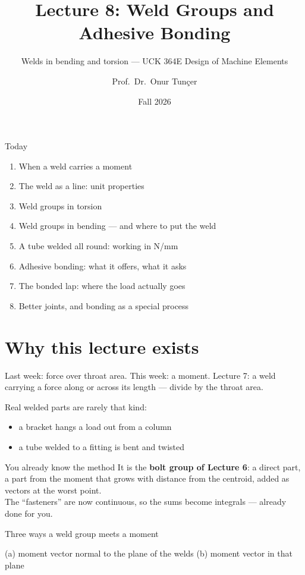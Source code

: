 \documentclass[aspectratio=169,10pt]{beamer}
\title{Lecture 8: Weld Groups and Adhesive Bonding}
\subtitle{Welds in bending and torsion --- UCK 364E Design of Machine Elements}
\author{Prof.\ Dr.\ Onur Tunçer}
\institute{Department of Aeronautical Engineering, Istanbul Technical University}
\date{Fall 2026}
\begin{document}
\maketitle

\begin{frame}{Today}
\begin{enumerate}
  \item When a weld carries a moment
  \item The weld as a line: unit properties
  \item Weld groups in torsion
  \item Weld groups in bending --- and where to put the weld
  \item A tube welded all round: working in N/mm
  \item Adhesive bonding: what it offers, what it asks
  \item The bonded lap: where the load actually goes
  \item Better joints, and bonding as a special process
\end{enumerate}
\end{frame}

\section{Why this lecture exists}

\begin{frame}{Last week: force over throat area. This week: a moment.}
Lecture 7: a weld carrying a force along or across its length --- divide by the throat area.

\medskip
Real welded parts are rarely that kind:
\begin{itemize}
  \item a bracket hangs a load out from a column
  \item a tube welded to a fitting is bent and twisted
\end{itemize}
\vfill
\begin{block}{You already know the method}
It is the \textbf{bolt group of Lecture 6}: a direct part, a part from the moment that grows with
distance from the centroid, added as vectors at the worst point.\\
The ``fasteners'' are now continuous, so the sums become integrals --- already done for you.
\end{block}
\end{frame}

\begin{frame}{Three ways a weld group meets a moment}
\centering
\resizebox{0.92\textwidth}{!}{}

\medskip
\raggedright\small
(a) moment vector normal to the plane of the welds \quad (b) moment vector in that plane
\end{frame}
\end{document}
